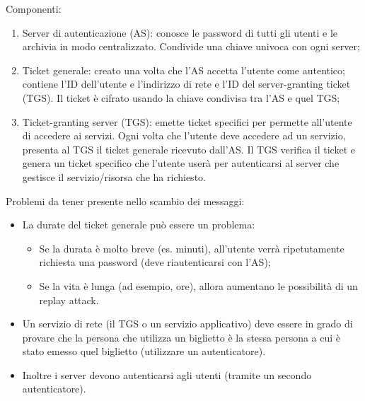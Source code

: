 Componenti:
\begin{enumerate}
    \item Server di autenticazione (AS): conosce le password di tutti gli utenti e le archivia in modo centralizzato. Condivide una chiave univoca con ogni server;
	\item Ticket generale: creato una volta che l'AS accetta l'utente come autentico; contiene l'ID dell'utente e l'indirizzo di rete e l'ID del server-granting ticket (TGS). Il ticket è cifrato usando la chiave condivisa tra l'AS e quel TGS;
	\item Ticket-granting server (TGS): emette ticket specifici per permette all'utente di accedere ai servizi. Ogni volta che l'utente deve accedere ad un servizio, presenta al TGS il ticket generale ricevuto dall'AS. Il TGS verifica il ticket e genera un ticket specifico che l'utente userà per autenticarsi al server che gestisce il servizio/risorsa che ha richiesto.
\end{enumerate}
	
Problemi da tener presente nello scambio dei messaggi:
\begin{itemize}
    \item La durate del ticket generale può essere un problema:
	\begin{itemize}
	    \item Se la durata è molto breve (es. minuti), all'utente verrà ripetutamente richiesta una password (deve riautenticarsi con l'AS);
		\item Se la vita è lunga (ad esempio, ore), allora aumentano le possibilità di un replay attack.
	\end{itemize}
	\item Un servizio di rete (il TGS o un servizio applicativo) deve essere in grado di provare che la persona che utilizza un biglietto è la stessa persona a cui è stato emesso quel biglietto (utilizzare un autenticatore).
	\item Inoltre i server devono autenticarsi agli utenti (tramite un secondo autenticatore).
\end{itemize}

